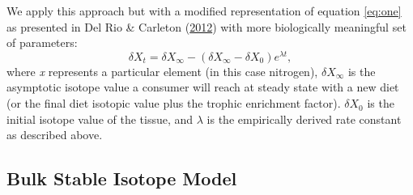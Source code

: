 \documentclass [11pt, proquest] {uwthesis}[2015/03/03]
\begin{document}
We apply this approach but with a modified representation of equation
\eqref{eq:one} as presented in Del Rio \& Carleton
(\protect\hyperlink{ref-DelRio2012}{2012}) with more biologically
meaningful set of parameters:
\begin{equation} 
  \delta X_t = \delta X_\infty - 
  (\delta X_\infty - \delta X_0)e^{\lambda t},
  \label{eq:three}
\end{equation}
where \emph{x} represents a particular element (in this case nitrogen),
\(\delta X_\infty\) is the asymptotic isotope value a consumer will
reach at steady state with a new diet (or the final diet isotopic value
plus the trophic enrichment factor). \(\delta X_0\) is the initial
isotope value of the tissue, and \(\lambda\) is the empirically derived
rate constant as described above.

\subsection{Bulk Stable Isotope Model}\label{bulk-stable-isotope-model}
\end{document}
